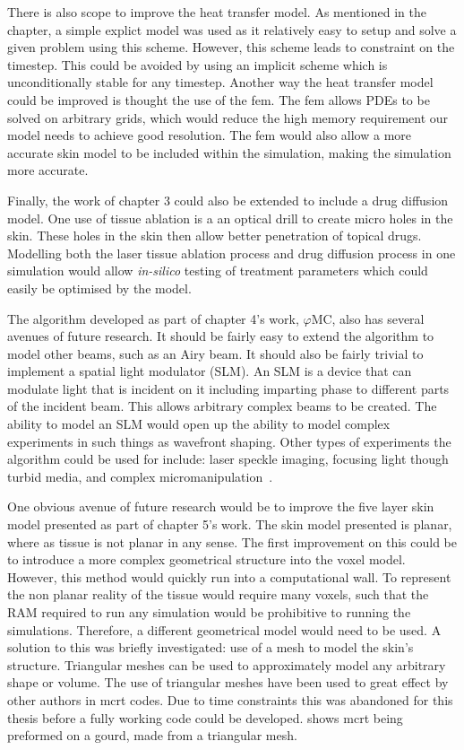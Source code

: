 There is also scope to improve the heat transfer model.
As mentioned in the chapter, a simple explict model was used as it relatively easy to setup and solve a given problem using this scheme.
However, this scheme leads to constraint on the timestep.
This could be avoided by using an implicit scheme which is unconditionally stable for any timestep.
Another way the heat transfer model could be improved is thought the use of the \gls*{fem}.
The \gls*{fem} allows PDEs to be solved on arbitrary grids, which would reduce the high memory requirement our model needs to achieve good resolution.
The \gls*{fem} would also allow a more accurate skin model to be included within the simulation, making the simulation more accurate.

Finally, the work of chapter 3 could also be extended to include a drug diffusion model.
One use of tissue ablation is a an optical drill to create micro holes in the skin. 
These holes in the skin then allow better penetration of topical drugs.
Modelling both the laser tissue ablation process and drug diffusion process in one simulation would allow \textit{in-silico} testing of treatment parameters which could easily be optimised by the model.

\medskip

The algorithm developed as part of chapter 4's work, $\varphi$MC, also has several avenues of future research.
It should be fairly easy to extend the algorithm to model other beams, such as an Airy beam.
It should also be fairly trivial to implement a spatial light modulator (SLM).
An SLM is a device that can modulate light that is incident on it including imparting phase to different parts of the incident beam.
This allows arbitrary complex beams to be created.
The ability to model an SLM would open up the ability to model complex experiments in such things as wavefront shaping.
Other types of experiments the algorithm could be used for include: laser speckle imaging, focusing light though turbid media, and complex micromanipulation~\cite{vellekoop2007focusing,horstmeyer2015guidestar,vcivzmar2010situ}.

\medskip

One obvious avenue of future research would be to improve the five layer skin model presented as part of chapter 5's work.
The skin model presented is planar, where as tissue is not planar in any sense.
The first improvement on this could be to introduce a more complex geometrical structure into the voxel model.
However, this method would quickly run into a computational wall.
To represent the non planar reality of the tissue would require many voxels, such that the RAM required to run any simulation would be prohibitive to running the simulations.
Therefore, a different geometrical model would need to be used.
A solution to this was briefly investigated: use of a mesh to model the skin's structure.
Triangular meshes can be used to approximately model any arbitrary shape or volume.
The use of triangular meshes have been used to great effect by other authors in \gls*{mcrt} codes.
Due to time constraints this was abandoned for this thesis before a fully working code could be developed.
 shows \gls*{mcrt} being preformed on a gourd, made from a triangular mesh.

